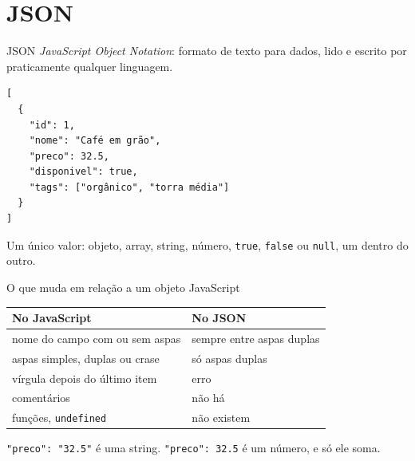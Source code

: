 \documentclass{beamer}
\begin{document}
\section{JSON}

\begin{frame}[fragile]{JSON}
	\emph{JavaScript Object Notation}: formato de texto para dados, lido e escrito
	por praticamente qualquer linguagem.

	\begin{verbatim}
[
  {
    "id": 1,
    "nome": "Café em grão",
    "preco": 32.5,
    "disponivel": true,
    "tags": ["orgânico", "torra média"]
  }
]
	\end{verbatim}

	Um único valor: objeto, array, string, número, \texttt{true},
	\texttt{false} ou \texttt{null}, um dentro do outro.
\end{frame}

\begin{frame}{O que muda em relação a um objeto JavaScript}
	\small
	\begin{tabular}{>{\raggedright\arraybackslash}p{}>{\raggedright\arraybackslash}p{}}
		\toprule
		No JavaScript & No JSON \\
		\midrule
		nome do campo com ou sem aspas & sempre entre aspas duplas \\ \midrule
		aspas simples, duplas ou crase & só aspas duplas \\ \midrule
		vírgula depois do último item & erro \\ \midrule
		comentários & não há \\ \midrule
		funções, \texttt{undefined} & não existem \\
		\bottomrule
	\end{tabular}

	\vspace{0.3cm}
	\texttt{"preco": "32.5"} é uma string. \texttt{"preco": 32.5} é um número, e
	só ele soma.
\end{frame}
\end{document}
